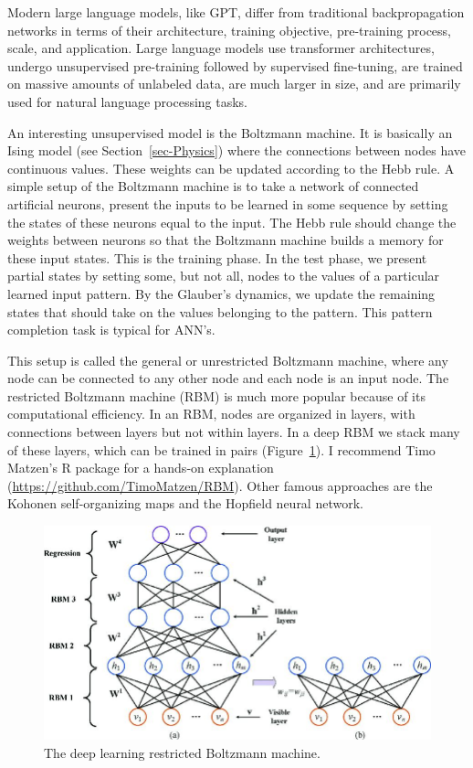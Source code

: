 \documentclass[
  a4paper,
  DIV=11,
  numbers=noendperiod,
  oneside]{scrreprt}
\begin{document}
Modern large language models, like GPT, differ from traditional
backpropagation networks in terms of their architecture, training
objective, pre-training process, scale, and application. Large language
models use transformer architectures, undergo unsupervised pre-training
followed by supervised fine-tuning, are trained on massive amounts of
unlabeled data, are much larger in size, and are primarily used for
natural language processing tasks.

An interesting unsupervised model is the Boltzmann machine. It is
basically an Ising model (see Section~\ref{sec-Physics}) where the
connections between nodes have continuous values. These weights can be
updated according to the Hebb rule. A simple setup of the Boltzmann
machine is to take a network of connected artificial neurons, present
the inputs to be learned in some sequence by setting the states of these
neurons equal to the input. The Hebb rule should change the weights
between neurons so that the Boltzmann machine builds a memory for these
input states. This is the training phase. In the test phase, we present
partial states by setting some, but not all, nodes to the values of a
particular learned input pattern. By the Glauber's dynamics, we update
the remaining states that should take on the values belonging to the
pattern. This pattern completion task is typical for ANN's.

This setup is called the general or unrestricted Boltzmann machine,
where any node can be connected to any other node and each node is an
input node. The restricted Boltzmann machine (RBM) is much more popular
because of its computational efficiency. In an RBM, nodes are organized
in layers, with connections between layers but not within layers. In a
deep RBM we stack many of these layers, which can be trained in pairs
(Figure~\ref{fig-ch5n-img5-old-43}). I recommend Timo Matzen's R package
for a hands-on explanation (\url{https://github.com/TimoMatzen/RBM}).
Other famous approaches are the Kohonen self-organizing maps and the
Hopfield neural network.

\begin{figure}

{\centering \includegraphics{media/ch5n/image5.jpg}

}

\caption{\label{fig-ch5n-img5-old-43}The deep learning restricted
Boltzmann machine.}

\end{figure}
\end{document}
